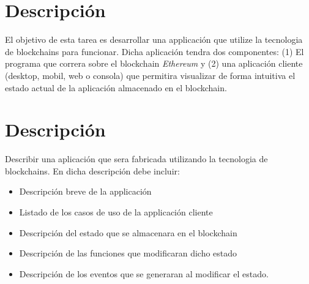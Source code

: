 \documentclass{article}
\begin{document}
\section*{Descripci\'on}
El objetivo de esta tarea es desarrollar una applicaci\'on que utilize la tecnologia
de blockchains para funcionar. Dicha aplicaci\'on tendra dos componentes: (1) El
programa que correra sobre el blockchain \emph{Ethereum} y (2) una aplicaci\'on
cliente (desktop, mobil, web o consola) que permitira visualizar de forma
intuitiva el estado actual de la aplicaci\'on almacenado en el blockchain.

\section*{Descripci\'on}
Describir una aplicaci\'on que sera fabricada utilizando la tecnologia de
blockchains. En dicha descripci\'on debe incluir:
\begin{itemize}
        \item{Descripci\'on breve de la applicaci\'on}
        \item{Listado de los casos de uso de la applicaci\'on cliente}
        \item{Descripci\'on del estado que se almacenara en el blockchain}
        \item{Descripci\'on de las funciones que modificaran dicho estado}
        \item{Descripci\'on de los eventos que se generaran al modificar el estado.}
\end{itemize}
\end{document}
